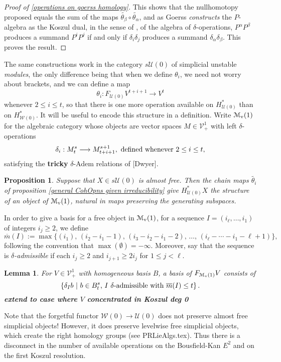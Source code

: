 \documentclass[11pt]{amsart}
\theoremstyle{plain}
\newtheorem{lem}[thm]{Lemma}
\newtheorem{prop}[thm]{Proposition}
\theoremstyle{definition}
\renewcommand{\to}{\longrightarrow}
\newcommand{\calU}{\mathcal{U}}
\newcommand{\calV}{\mathcal{V}}
\newcommand{\calw}{\mathcal{W}}
\newcommand{\calMv}{\mathcal{M}_\textup{v}}
\theoremstyle{plain}
\newcommand{\vect}[2]{\calV^{#1}_{#2}}
\newcommand{\minDimP}{\overline{m}}
\begin{document}
\begin{Cohomology Operations for W and U}
\begin{proof}[Proof of \ref{operations on goerss homology}]
This shows that the nullhomotopy proposed equals the sum of the maps $\widetilde{\theta_\beta}\circ\widetilde{\theta_\alpha}$, and as Goerss \cite{MR1089001} \emph{constructs} the $P$-algebra as the Koszul dual, in the sense of \cite{PriddyKoszul.pdf}, of the algebra of $\delta$-operations, $P^{\alpha }P^{\beta}$ produces a summand $P^iP^j$ if and only if $\delta_i\delta_j$ produces a summand $\delta_{\alpha }\delta_{\beta}$. This proves the result.
\end{proof}
The same constructions work in the category $s\calU(0)$ of simplicial unstable \emph{modules}, the only difference being that when we define $\theta_i$, we need not worry about brackets, and we can define a map
\[\theta_i:F_{\calU(0)}V^{t+i+1}\to V^t\]
whenever $2\leq i\leq t$, so that there is one more operation available on $H^*_{\calU(0)}$ than on $H^*_{\calw(0)}$. It will be useful to encode this structure in a definition. Write $\calMv(1)$ for the algebraic category whose objects are vector spaces $M\in\vect{1}{+}$ with left $\delta$-operations
\[\delta_i:M^{s}_t\to M^{s+1}_{t+i+1},\textup{ defined whenever $2\leq i\leq t$,}\]
satisfying the \textbf{tricky} $\delta$-Adem relations of [Dwyer].
\begin{prop}\label{operations on untable P homology}
Suppose that $X\in s\calU(0)$ is almost free. Then the chain maps $\widetilde{\theta_i}$ of proposition \ref{general CohOpns given irreducibility} give $H^*_{\calU(0)}X$ the structure of an object of $\calMv(1)$, natural in maps preserving the generating subspaces.
\end{prop}
In order to give a basis for a free object in $\calMv(1)$, for a sequence $I=(i_\ell,\ldots,i_1)$ of integers $i_j\geq2$, we define
\[\minDimP(I):=\max\{(i_1),\,(i_2-i_1-1),\,(i_3-i_2-i_1-2),\,\ldots,\,(i_{\ell}-\cdots-i_1-\ell+1)\},
\]
following the convention that $\max(\emptyset)=-\infty$. Moreover, say that the sequence is \emph{$\delta$-admissible} if each $i_j\geq2$ and  $i_{j+1}\geq 2i_j$ for $1\leq j <\ell$.
\begin{lem}\label{basis of element of M(0)}
For $V\in\vect{1}{+}$ with homogeneous basis $B$, a basis of $F_{\calMv(1)}V$ consists of
\[\left\{\delta_Ib\ \middle|\ b\in B^{s}_t\textup{, $I$ $\delta$-admissible with }\minDimP(I)\leq t\right\}.\]
\textbf{extend to case where $V$ concentrated in Koszul deg 0}\end{lem}
\begin{shaded}
Note that the forgetful functor $\calw(0)\to\calU(0)$ does not preserve almost free simplicial objects! However, it does preserve levelwise free simplicial objects, which create the right homology groups (see PRLieAlgs.tex). Thus there is a disconnect in the number of available operations on the Bousfield-Kan $E^2$ and on the first Koszul resolution.
\end{shaded}


\end{Cohomology Operations for W and U}
\end{document}
